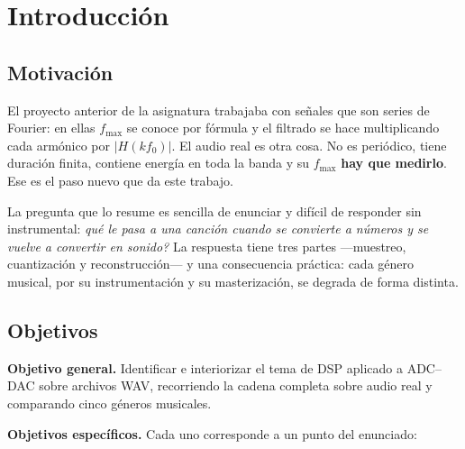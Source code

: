 \documentclass[11pt,a4paper]{article}
\newcommand{\fmax}{f_{\max}}
\begin{document}
\section{Introducción}

\subsection{Motivación}

El proyecto anterior de la asignatura trabajaba con señales que son series de
Fourier: en ellas \(\fmax\) se conoce por fórmula y el filtrado se hace
multiplicando cada armónico por \(|H(k f_0)|\). El audio real es otra cosa. No
es periódico, tiene duración finita, contiene energía en toda la banda y su
\(\fmax\) \textbf{hay que medirlo}. Ese es el paso nuevo que da este trabajo.

La pregunta que lo resume es sencilla de enunciar y difícil de responder sin
instrumental: \emph{\textquestiondown{}qué le pasa a una canción cuando se convierte a números y
se vuelve a convertir en sonido?} La respuesta tiene tres partes ---muestreo,
cuantización y reconstrucción--- y una consecuencia práctica: cada género
musical, por su instrumentación y su masterización, se degrada de forma
distinta.

\subsection{Objetivos}

\textbf{Objetivo general.} Identificar e interiorizar el tema de DSP aplicado a
ADC--DAC sobre archivos WAV, recorriendo la cadena completa sobre audio real y
comparando cinco géneros musicales.

\textbf{Objetivos específicos.} Cada uno corresponde a un punto del enunciado:
\end{document}
